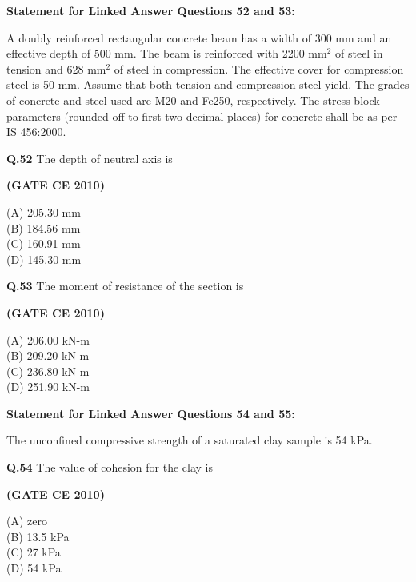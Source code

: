 \documentclass[journal,12pt,onecolumn]{exam}
\theoremstyle{remark}
\begin{document}
\noindent\textbf{Statement for Linked Answer Questions 52 and 53:}

A doubly reinforced rectangular concrete beam has a width of 300 mm and an effective depth of 500 mm. The beam is reinforced with 2200 mm\(^2\) of steel in tension and 628 mm\(^2\) of steel in compression. The effective cover for compression steel is 50 mm. Assume that both tension and compression steel yield. The grades of concrete and steel used are M20 and Fe250, respectively. The stress block parameters (rounded off to first two decimal places) for concrete shall be as per IS 456:2000.

\setlength{\parskip}{0.5cm}

\noindent\textbf{Q.52} The depth of neutral axis is

\setlength{\parskip}{0.5cm}

\hfill\textbf{(GATE CE 2010)}

\begin{multicols}{4}
\noindent(A) 205.30 mm\\
(B) 184.56 mm\\
(C) 160.91 mm\\
(D) 145.30 mm
\end{multicols}

\setlength{\parskip}{0.5cm}

\noindent\textbf{Q.53} The moment of resistance of the section is

\setlength{\parskip}{0.5cm}

\hfill\textbf{(GATE CE 2010)}

\begin{multicols}{4}
\noindent(A) 206.00 kN-m\\
(B) 209.20 kN-m\\
(C) 236.80 kN-m\\
(D) 251.90 kN-m
\end{multicols}

\setlength{\parskip}{0.5cm}

\noindent\textbf{Statement for Linked Answer Questions 54 and 55:}

The unconfined compressive strength of a saturated clay sample is 54 kPa.

\setlength{\parskip}{0.5cm}

\noindent\textbf{Q.54} The value of cohesion for the clay is

\setlength{\parskip}{0.5cm}

\hfill\textbf{(GATE CE 2010)}

\begin{multicols}{4}
\noindent(A) zero\\
(B) 13.5 kPa\\
(C) 27 kPa\\
(D) 54 kPa
\end{multicols}
\end{document}
